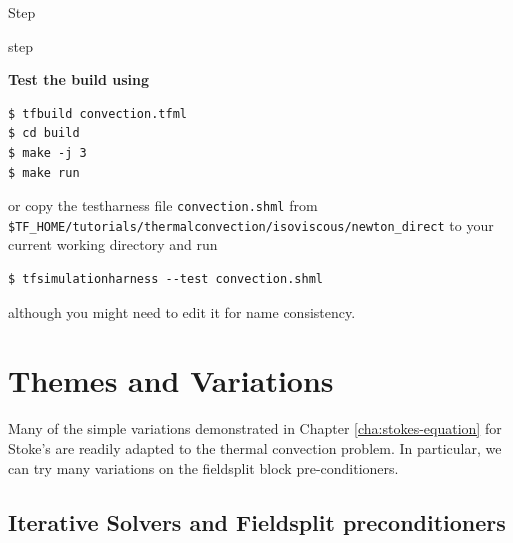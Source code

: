 \begin{steps}{Step}
\begin{steps}{step}
   \end{steps}
  \item \textbf{Test the build using}
   \begin{lstlisting}[style=Bash]
$ tfbuild convection.tfml
$ cd build
$ make -j 3
$ make run
   \end{lstlisting}
or copy the testharness file \texttt{convection.shml} from
\texttt{\$TF\_HOME/tutorials/thermalconvection/isoviscous/newton\_direct}
to your current working directory and run
\begin{lstlisting}[style=Bash]
  $ tfsimulationharness --test convection.shml 
\end{lstlisting}
although you might need to edit it for name consistency.

\end{steps}


\section{Themes and Variations}
\label{sec:themes-variations}

Many of the simple variations demonstrated in Chapter
\ref{cha:stokes-equation} for Stoke's  are readily adapted
to the thermal convection problem.  In particular, we can try many
variations on the fieldsplit block pre-conditioners.

\subsection{Iterative Solvers and Fieldsplit preconditioners}
\label{sec:iterative-solvers-1}

